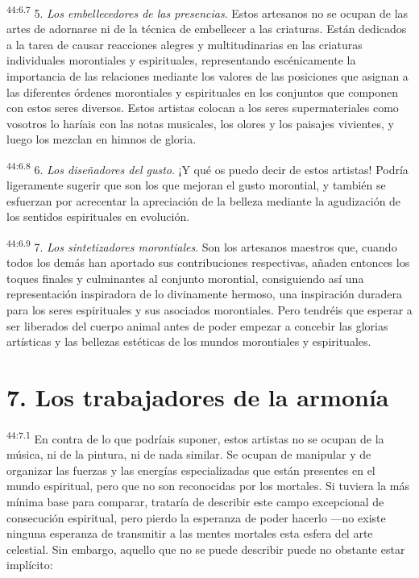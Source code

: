 \par
\textsuperscript{44:6.7} 5. \textit{Los embellecedores de las presencias}. Estos artesanos no se ocupan de las artes de adornarse ni de la técnica de embellecer a las criaturas. Están dedicados a la tarea de causar reacciones alegres y multitudinarias en las criaturas individuales morontiales y espirituales, representando escénicamente la importancia de las relaciones mediante los valores de las posiciones que asignan a las diferentes órdenes morontiales y espirituales en los conjuntos que componen con estos seres diversos. Estos artistas colocan a los seres supermateriales como vosotros lo haríais con las notas musicales, los olores y los paisajes vivientes, y luego los mezclan en himnos de gloria.

\par
\textsuperscript{44:6.8} 6. \textit{Los diseñadores del gusto}. ¡Y qué os puedo decir de estos artistas! Podría ligeramente sugerir que son los que mejoran el gusto morontial, y también se esfuerzan por acrecentar la apreciación de la belleza mediante la agudización de los sentidos espirituales en evolución.

\par
\textsuperscript{44:6.9} 7. \textit{Los sintetizadores morontiales}. Son los artesanos maestros que, cuando todos los demás han aportado sus contribuciones respectivas, añaden entonces los toques finales y culminantes al conjunto morontial, consiguiendo así una representación inspiradora de lo divinamente hermoso, una inspiración duradera para los seres espirituales y sus asociados morontiales. Pero tendréis que esperar a ser liberados del cuerpo animal antes de poder empezar a concebir las glorias artísticas y las bellezas estéticas de los mundos morontiales y espirituales.

\section*{7. Los trabajadores de la armonía}
\par
\textsuperscript{44:7.1} En contra de lo que podríais suponer, estos artistas no se ocupan de la música, ni de la pintura, ni de nada similar. Se ocupan de manipular y de organizar las fuerzas y las energías especializadas que están presentes en el mundo espiritual, pero que no son reconocidas por los mortales. Si tuviera la más mínima base para comparar, trataría de describir este campo excepcional de consecución espiritual, pero pierdo la esperanza de poder hacerlo ---no existe ninguna esperanza de transmitir a las mentes mortales esta esfera del arte celestial. Sin embargo, aquello que no se puede describir puede no obstante estar implícito:

